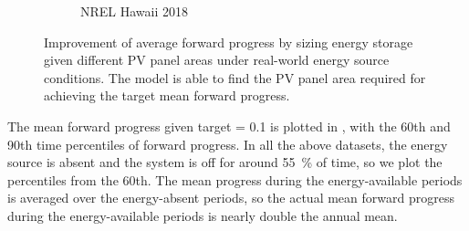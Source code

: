 \begin{figure}
\begin{subfigure}{0.483\columnwidth}
        \caption{NREL Hawaii 2018}
        \label{fig:harvstor4}
    \end{subfigure}
    \caption{Improvement of average forward progress by sizing energy storage given different PV panel areas under real-world energy source conditions. The model is able to find the PV panel area required for achieving the target mean forward progress. } 
    \label{fig:harvstor}
\end{figure}

The mean forward progress given target  = 0.1 is plotted in , with the 60th and 90th time percentiles of forward progress. In all the  above datasets, the energy source is absent and the system is off for around \SI{55}{\percent} of time, so we plot the percentiles from the 60th. The mean progress during the energy-available periods is averaged over the energy-absent periods, so the actual mean forward progress during the energy-available periods is nearly double the annual mean. 



